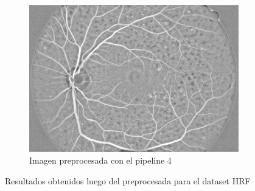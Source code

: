 \begin{figure} [H]
    \begin{subfigure}[b]{0.3\textwidth}
        \includegraphics[width=\textwidth]{Figures/HRF/HRF_Pip4_01_dr_cropped}
        \caption{Imagen preprocesada con el pipeline 4}
        \label{fig:mouse}
    \end{subfigure}
    \caption{Resultados obtenidos luego del preprocesada para el dataset HRF}\label{fig:animals}
\end{figure}

